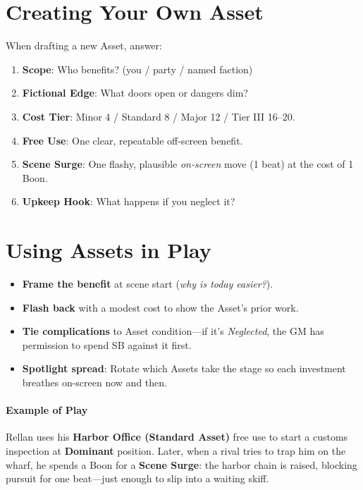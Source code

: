 \section{Creating Your Own Asset}
When drafting a new Asset, answer:
\begin{enumerate}
  \item \textbf{Scope}: Who benefits? (you / party / named faction)
  \item \textbf{Fictional Edge}: What doors open or dangers dim?
  \item \textbf{Cost Tier}: Minor 4 / Standard 8 / Major 12 / Tier III 16–20.
  \item \textbf{Free Use}: One clear, repeatable off-screen benefit.
  \item \textbf{Scene Surge}: One flashy, plausible \emph{on-screen} move (1 beat) at the cost of 1 Boon.
  \item \textbf{Upkeep Hook}: What happens if you neglect it?
\end{enumerate}

\section{Using Assets in Play}
\begin{itemize}
  \item \textbf{Frame the benefit} at scene start (\emph{why is today easier?}).
  \item \textbf{Flash back} with a modest cost to show the Asset's prior work.
  \item \textbf{Tie complications} to Asset condition—if it's \emph{Neglected}, the GM has permission to spend SB against it first.
  \item \textbf{Spotlight spread}: Rotate which Assets take the stage so each investment breathes on-screen now and then.
\end{itemize}

\paragraph{Example of Play}
Rellan uses his \textbf{Harbor Office (Standard Asset)} free use to start a customs inspection at \textbf{Dominant} position. Later, when a rival tries to trap him on the wharf, he spends a Boon for a \textbf{Scene Surge}: the harbor chain is raised, blocking pursuit for one beat—just enough to slip into a waiting skiff.

